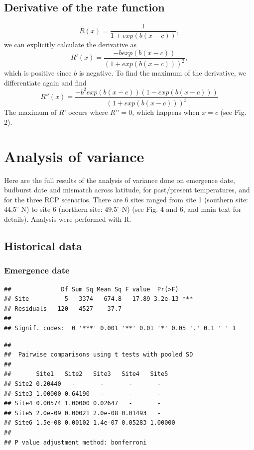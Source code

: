 \documentclass[12 pt]{article}
\begin{document}
\subsection*{Derivative of the rate function}
\begin{equation}
    R(x)=\frac{1}{1+exp(b(x-c))}, \tag*{Eq. S\theequation}
\end{equation}
we can explicitly calculate the derivative as
\begin{equation}
    R'(x)=\frac{-b exp(b(x-c))}{(1+exp(b(x-c)))^2}, \tag*{Eq. S\theequation}
\end{equation}
which is positive since $b$ is negative. To find the maximum of the derivative, we differentiate again and find
\begin{equation}
    R''(x) = \frac{-b^2 exp(b(x-c))(1-exp(b(x-c)))}{(1+exp(b(x-c)))^3} \tag*{Eq. S\theequation}
\end{equation}
The maximum of $R’$ occurs where $R’’ = 0$, which happens when $x = c$ (see Fig. 2).

\section{Analysis of variance}
Here are the full results of the analysis of variance done on emergence date, budburst date and mismatch across latitude, for past/present temperatures, and for the three RCP scenarios. There are $6$ sites ranged from site 1 (southern site: $44.5^{\circ}$ N) to site 6 (northern site: $49.5^{\circ}$ N) (see Fig. 4 and 6, and main text for details). Analysis were performed with R.
\subsection{Historical data}
\subsubsection*{Emergence date}

\begin{verbatim}
##              Df Sum Sq Mean Sq F value  Pr(>F)    
## Site          5   3374   674.8   17.89 3.2e-13 ***
## Residuals   120   4527    37.7                    
## 
## Signif. codes:  0 '***' 0.001 '**' 0.01 '*' 0.05 '.' 0.1 ' ' 1
\end{verbatim}

\begin{verbatim}
## 
##  Pairwise comparisons using t tests with pooled SD 
## 
##       Site1   Site2   Site3   Site4   Site5  
## Site2 0.20440   -       -       -       -      
## Site3 1.00000 0.64190   -       -       -      
## Site4 0.00574 1.00000 0.02647   -       -      
## Site5 2.0e-09 0.00021 2.0e-08 0.01493   -      
## Site6 1.5e-08 0.00102 1.4e-07 0.05283 1.00000
## 
## P value adjustment method: bonferroni
\end{verbatim}
\end{document}
